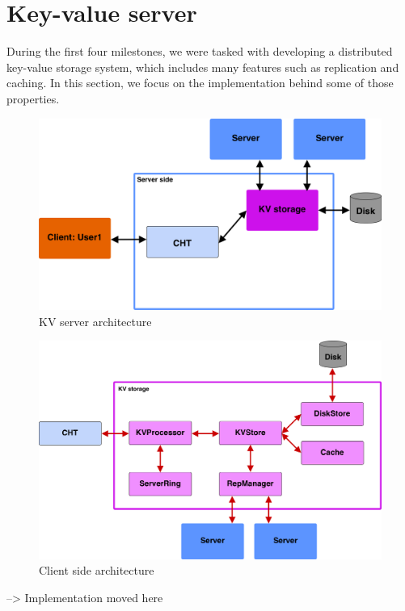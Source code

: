 \section{Key-value server}
During the first four milestones, we were tasked with developing a distributed key-value storage system, which includes many features such as replication and caching. In this section, we focus on the implementation behind some of those properties.

\begin{figure}[h]
	\centering
	\includegraphics[width=\linewidth]{figures/kvserver/ms4_structure.png}
	\caption{KV server architecture}
\end{figure}




\begin{figure}[h]
	\centering
	\includegraphics[width=\linewidth]{figures/kvserver/kvs_arch.png}
	\caption{Client side architecture}
\end{figure}


--> Implementation moved here


